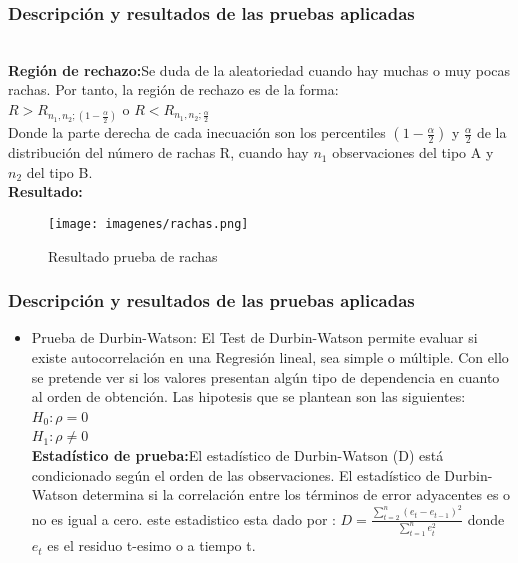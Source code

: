 \documentclass[12pt]{beamer}
\begin{document}
\begin{frame}
\frametitle{Descripción y resultados de las pruebas aplicadas}
~\\ \textbf{Región de rechazo:}Se duda de la aleatoriedad cuando hay muchas o muy pocas rachas. Por tanto, la región de rechazo es de la forma:
~\\ $R>R_{n_{1},n_{2};(1-\frac{\alpha}{2})}$ o $R<R_{n_{1},n_{2};\frac{\alpha}{2}}$
~\\Donde la parte derecha de cada inecuación son los percentiles $(1-\frac{\alpha}{2})$ y $\frac{\alpha}{2}$ de la distribución del número de rachas R, cuando hay $n_{1}$ observaciones del tipo A y $n_{2}$ del tipo B.
~\\ \textbf{Resultado:}
\begin{figure}[!h]
    \begin{center}
        \texttt{[image: imagenes/rachas.png]}
        \caption{Resultado prueba de rachas}
        \label{fig:Densidad}
    \end{center}
\end{figure}
\end{frame}

\begin{frame}
\frametitle{Descripción y resultados de las pruebas aplicadas}
\begin{itemize}
\item Prueba de Durbin-Watson: El Test de Durbin-Watson permite evaluar si existe autocorrelación en una Regresión lineal, sea simple o múltiple. Con ello se pretende ver si los valores presentan algún tipo de dependencia en cuanto al orden de obtención. Las hipotesis que se plantean son las siguientes:
~\\$H_{0}:\rho=0$
~\\$H_{1}:\rho\neq 0$
~\\ \textbf{Estadístico de prueba:}El estadístico de Durbin-Watson (D) está condicionado según el orden de las observaciones. El estadístico de Durbin-Watson determina si la correlación entre los términos de error adyacentes es o no es igual a cero. este estadistico esta dado por : $D=\frac{\sum\limits_{t=2}^{n}(e_{t}-e_{t-1})^2}{\sum\limits_{t=1}^{n}e_{t}^2}$ donde $e_{t}$ es el residuo t-esimo o a tiempo t.
\end{itemize}
\end{frame}
\end{document}
